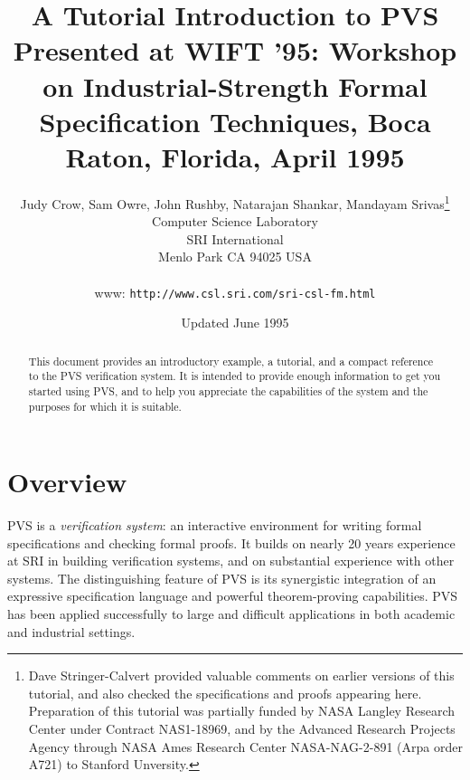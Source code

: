 \documentclass[11pt,part]{article}
\title{{\Huge\bf A Tutorial Introduction to PVS}\\
\smaller  Presented at WIFT '95: Workshop on Industrial-Strength Formal
Specification Techniques, Boca Raton, Florida, April 1995}
\author{Judy Crow, Sam Owre, John Rushby, Natarajan Shankar, Mandayam
Srivas\thanks{Dave Stringer-Calvert provided valuable comments on
earlier versions of this tutorial, and also checked the specifications
and proofs appearing here.   Preparation of this tutorial was
partially funded by NASA Langley Research Center under Contract
NAS1-18969, and by the Advanced Research Projects Agency through NASA
Ames Research Center NASA-NAG-2-891 (Arpa order A721) to
Stanford Unversity.}\\
Computer Science Laboratory\\
SRI International\\
Menlo Park CA 94025 USA
\\ \mbox{ }\\
{\sc www}: {\tt http://www.csl.sri.com/sri-csl-fm.html}
}
\date{Updated June 1995}
\begin{document}
 
\maketitle
\begin{abstract}
This document provides an introductory example, a tutorial, and a
compact reference to the PVS verification system.  It is intended to
provide enough information to get you started using PVS, and to help
you appreciate the capabilities of the system and the purposes for
which it is suitable.


\end{abstract}
\thispagestyle{empty}
\newpage
\evensidemargin 0.0in
\mbox{}
\thispagestyle{empty}
\newpage

\setcounter{page}{1} 


\tableofcontents
\cleardoublepage

\setcounter{page}{0} 

\section*{Overview}

PVS is a {\em verification system\/}:  an interactive environment for
writing formal specifications and checking formal proofs.  It builds on
nearly 20 years experience at SRI in building verification systems, and on
substantial experience with other systems.  The distinguishing feature of
PVS is its synergistic integration of an expressive specification
language and powerful theorem-proving capabilities.  PVS has been
applied successfully to large and difficult applications in both
academic and industrial settings.
\end{document}
